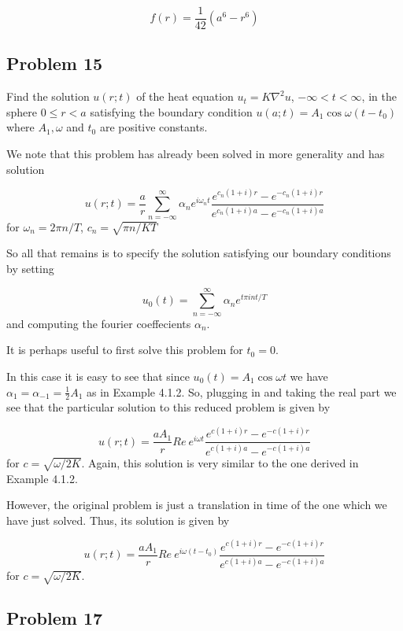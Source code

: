 \documentclass[12pt]{article}
\begin{document}
\[f(r)= \frac{1}{42}(a^6 - r^6)\]




\subsection{Problem 15}

Find the solution $u(r;t)$ of the heat equation $u_t = K \nabla^2u$, $-\infty<t<\infty$, in the sphere $0 \leq r <a$ satisfying the boundary condition $u(a;t) = A_1 \cos{\omega(t-t_0)}$ where $A_1, \omega$ and $t_0$ are positive constants.

We note that this problem has already been solved in more generality \cite[Page 239]{pinsky} and has solution

\[u(r;t)=\frac{a}{r}\sum^\infty_{n=-\infty}{\alpha_n e^{i \omega_n t}\frac{e^{c_n(1+i)r}-e^{-c_n (1+i) r}}{e^{c_n(1+i)a}-e^{-c_n (1+i) a}}}\] for $\omega_n=2\pi n/T$, $c_n=\sqrt{\pi n/KT}$

So all that remains is to specify the solution satisfying our boundary conditions by setting 

\[u_0(t)=\sum^\infty_{n=-\infty}\alpha_n e^{t\pi i n t/T}\] and computing the fourier coeffecients $\alpha_n$.

It is perhaps useful to first solve this problem for $t_0=0$.

In this case it is easy to see that since $u_0(t)=A_1\cos{\omega t}$ we have $\alpha_1=\alpha_{-1}=\frac{1}{2}A_1$ as in Example 4.1.2\cite[Page 239]{pinsky}. So, plugging in and taking the real part we see that the particular solution to this reduced problem is given by

\[u(r;t)=\frac{a A_1}{r}Re\ { e^{i \omega t}\frac{e^{c(1+i)r}-e^{-c (1+i) r}}{e^{c(1+i)a}-e^{-c (1+i) a}}}\] for $c=\sqrt{\omega/2K}$. Again, this solution is very similar to the one derived in Example 4.1.2\cite[Page 239]{pinsky}. 

However, the original problem is just a translation in time of the one which we have just solved.  Thus, its solution is given by 

\[u(r;t)=\frac{a A_1}{r}Re\ { e^{i \omega (t-t_0)}\frac{e^{c(1+i)r}-e^{-c (1+i) r}}{e^{c(1+i)a}-e^{-c (1+i) a}}}\] for $c=\sqrt{\omega/2K}$.




\subsection{Problem 17}
\end{document}
